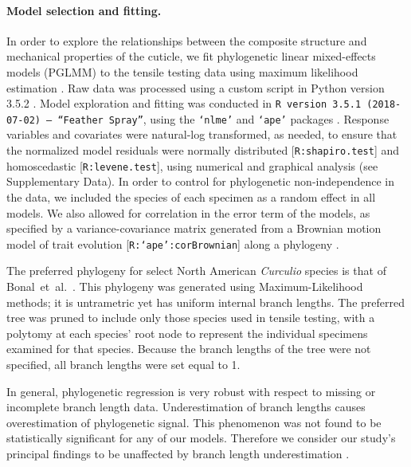 \documentclass[twocolumn, linenumbers, superscriptaddress, nofootinbib]{revtex4-1}
\begin{document}
			\paragraph*{Model selection and fitting.}
				In order to explore the relationships between the composite structure and mechanical properties of the cuticle, we fit phylogenetic linear mixed-effects models (PGLMM) to the tensile testing data using maximum likelihood estimation \cite{Galecki2013, Hadfield2010, Houseworth2004, Stone2011glmm}.
				Raw data was processed using a custom script in Python version 3.5.2 \cite{Python}.
				Model exploration and fitting was conducted in \texttt{R version 3.5.1 (2018-07-02) -- ``Feather Spray''}, using the \texttt{`nlme'} and \texttt{`ape'} packages \cite{Rcite, Ape, Nlme}.
				Response variables and covariates were natural-log transformed, as needed, to ensure that the normalized model residuals were normally distributed [\texttt{R:shapiro.test}] and homoscedastic [\texttt{R:levene.test}], using numerical and graphical analysis (see Supplementary Data).
				In order to control for phylogenetic non-independence in the data, we included the species of each specimen as a random effect in all models.
				We also allowed for correlation in the error term of the models, as specified by a variance-covariance matrix generated from a Brownian motion model of trait evolution [\texttt{R:`ape':corBrownian}] along a phylogeny \cite{Munkemuller2012, Ape}.
				
				The preferred phylogeny for select North American \textit{Curculio} species is that of Bonal~et~al.~\cite{Bonal2016}.
				This phylogeny was generated using Maximum-Likelihood methods; it is untrametric yet has uniform internal branch lengths.
				The preferred tree was pruned to include only those species used in tensile testing, with a polytomy at each species' root node to represent the individual specimens examined for that species.
				Because the branch lengths of the tree were not specified, all branch lengths were set equal to 1.
				
				In general, phylogenetic regression is very robust with respect to missing or incomplete branch length data.
				Underestimation of branch lengths causes overestimation of phylogenetic signal.
				This phenomenon was not found to be statistically significant for any of our models.
				Therefore we consider our study's principal findings to be unaffected by branch length underestimation \cite{Munkemuller2012, Molina2017, Stone2011star}.
				
\end{document}
